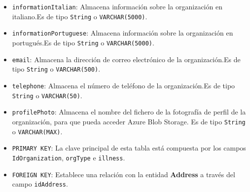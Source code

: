 \begin{itemize}
\begin{itemize}
        \item \texttt{informationItalian}: Almacena información sobre la organización en italiano.Es de tipo \texttt{String} o \texttt{VARCHAR(5000)}.
        \item \texttt{informationPortuguese}: Almacena información sobre la organización en portugués.Es de tipo \texttt{String} o \texttt{VARCHAR(5000)}.
        \item \texttt{email}: Almacena la dirección de correo electrónico de la organización.Es de tipo \texttt{String} o \texttt{VARCHAR(500)}.
        \item \texttt{telephone}: Almacena el número de teléfono de la organización.Es de tipo \texttt{String} o \texttt{VARCHAR(50)}.
        \item \texttt{profilePhoto}: Almacena el nombre del fichero de la fotografía de perfil de la organización, para que pueda acceder Azure Blob Storage. Es de tipo \texttt{String} o \texttt{VARCHAR(MAX)}.
        \item \texttt{PRIMARY KEY}: La clave principal de esta tabla está compuesta por los campos \texttt{IdOrganization}, \texttt{orgType} e \texttt{illness}.
        \item \texttt{FOREIGN KEY}: Establece una relación con la entidad \textbf{Address} a través del campo \texttt{idAddress}.
        \end{itemize}
        


\end{itemize}
